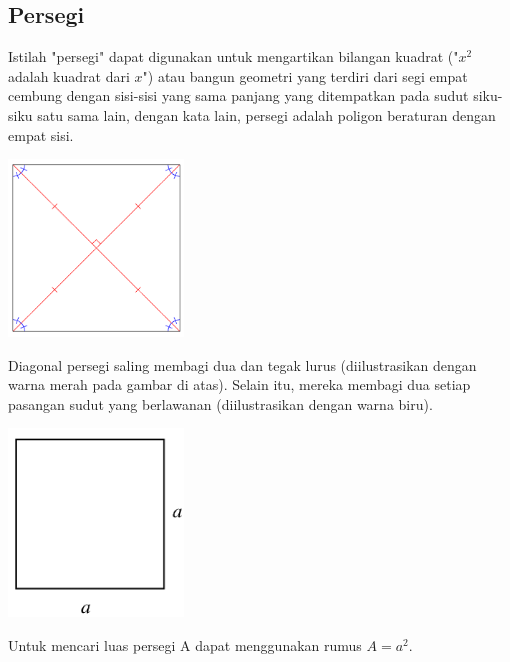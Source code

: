 \subsection{Persegi}
Istilah "persegi" dapat digunakan untuk mengartikan bilangan kuadrat ("$x^2$ adalah kuadrat dari $x$") atau bangun geometri yang terdiri dari segi empat cembung dengan sisi-sisi yang sama panjang yang ditempatkan pada sudut siku-siku satu sama lain, dengan kata lain, persegi adalah poligon beraturan dengan empat sisi.\citep{Squarefr70:online}
\begin{center}
	\includegraphics[width=0.35\textwidth]{gambar/persegipustaka.png}
\end{center}
Diagonal persegi saling membagi dua dan tegak lurus (diilustrasikan dengan warna merah pada gambar di atas). Selain itu, mereka membagi dua setiap pasangan sudut yang berlawanan (diilustrasikan dengan warna biru).\citep{Squarefr70:online}
\begin{center}
	\includegraphics[width=0.35\textwidth]{gambar/Square_1000.png}
\end{center}
Untuk mencari luas persegi A dapat menggunakan rumus $A = a^2$.\citep{Squarefr70:online}

